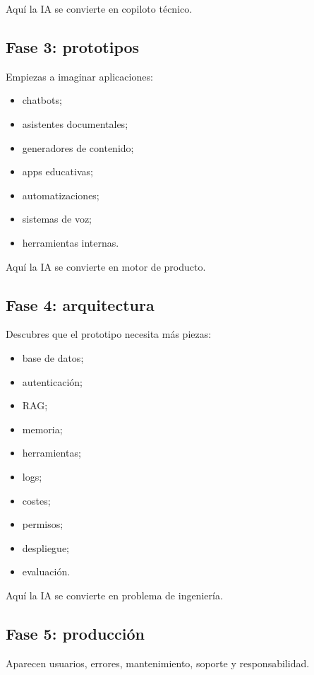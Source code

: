 Aquí la IA se convierte en copiloto técnico.

\subsection{Fase 3: prototipos}\label{fase-3-prototipos}

Empiezas a imaginar aplicaciones:

\begin{itemize}
\tightlist
\item
  chatbots;
\item
  asistentes documentales;
\item
  generadores de contenido;
\item
  apps educativas;
\item
  automatizaciones;
\item
  sistemas de voz;
\item
  herramientas internas.
\end{itemize}

Aquí la IA se convierte en motor de producto.

\subsection{Fase 4: arquitectura}\label{fase-4-arquitectura}

Descubres que el prototipo necesita más piezas:

\begin{itemize}
\tightlist
\item
  base de datos;
\item
  autenticación;
\item
  RAG;
\item
  memoria;
\item
  herramientas;
\item
  logs;
\item
  costes;
\item
  permisos;
\item
  despliegue;
\item
  evaluación.
\end{itemize}

Aquí la IA se convierte en problema de ingeniería.

\subsection{Fase 5: producción}\label{fase-5-producciuxf3n}

Aparecen usuarios, errores, mantenimiento, soporte y responsabilidad.

